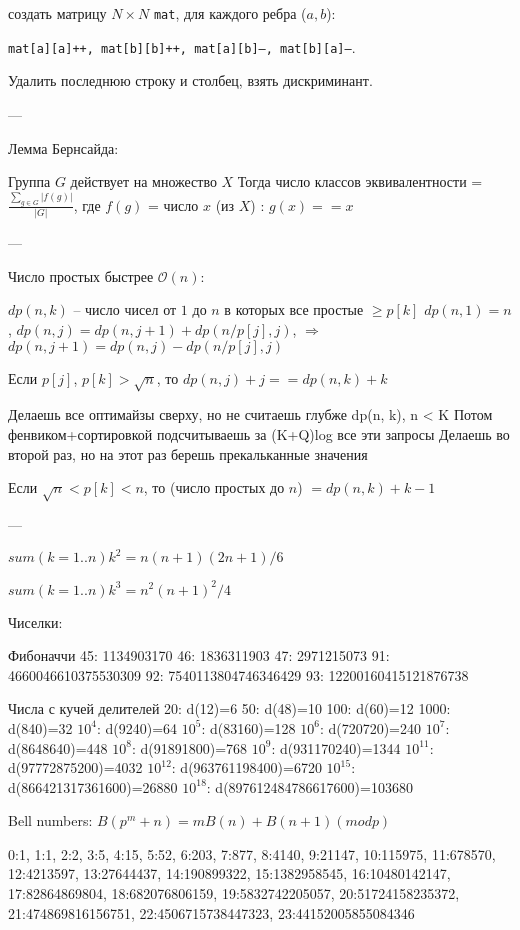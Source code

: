     создать матрицу $N \times N$ \texttt{mat}, для каждого ребра ($a, b$):
    
	\texttt{mat[a][a]++, mat[b][b]++, mat[a][b]--, mat[b][a]--}.
	
	Удалить последнюю строку и столбец, взять дискриминант.
	
---

Лемма Бернсайда:

Группа $G$ действует на множество $X$
Тогда число классов эквивалентности = $\frac{\sum_{g \in G} {|f(g)|}}{|G|}$,
где $f(g)$ = число $x$ (из $X$) : $g(x) == x$

---

Число простых быстрее $\mathcal{O}(n)$: 

$dp(n, k)$ -- число чисел от $1$ до $n$ в которых все простые $\ge p[k]$
$dp(n, 1) = n$, $dp(n, j) = dp(n, j + 1) + dp(n / p[j], j)$, $\Rightarrow$ $dp(n, j + 1) = dp(n, j) - dp(n / p[j], j)$

Если $p[j]$, $p[k] > \sqrt{n}$, то $dp(n, j) + j == dp(n, k) + k$

Делаешь все оптимайзы сверху, но не считаешь глубже dp(n, k), n < K
Потом фенвиком+сортировкой подсчитываешь за (K+Q)log все эти запросы
Делаешь во второй раз, но на этот раз берешь прекальканные значения

Если $\sqrt{n} < p[k] < n$, то (число простых до $n$) $= dp(n, k) + k - 1$

---

$sum(k=1..n) k^2 = n(n+1)(2n+1)/6$

$sum(k=1..n) k^3 = n^2(n+1)^2/4$


Чиселки: 

Фибоначчи
45:  1134903170
46:  1836311903
47:  2971215073
91:  4660046610375530309
92:  7540113804746346429
93:  12200160415121876738

Числа с кучей делителей
20: d(12)=6
50: d(48)=10
100: d(60)=12
1000: d(840)=32
$10^4$: d(9240)=64
$10^5$: d(83160)=128
$10^6$: d(720720)=240
$10^7$: d(8648640)=448
$10^8$: d(91891800)=768
$10^9$: d(931170240)=1344
$10^{11}$: d(97772875200)=4032
$10^{12}$: d(963761198400)=6720
$10^{15}$: d(866421317361600)=26880
$10^{18}$: d(897612484786617600)=103680

Bell numbers:
$B(p^m + n) = mB(n) + B(n + 1) (mod p)$

0:1, 1:1, 2:2, 3:5, 4:15, 5:52, 6:203, 7:877, 8:4140, 9:21147,
10:115975, 11:678570, 12:4213597, 13:27644437, 14:190899322,
15:1382958545, 16:10480142147, 17:82864869804, 18:682076806159,
19:5832742205057, 20:51724158235372, 21:474869816156751,
22:4506715738447323, 23:44152005855084346

